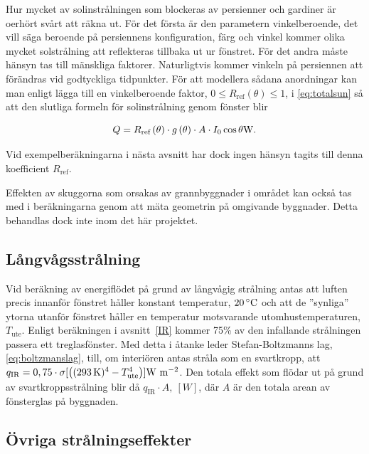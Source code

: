 Hur mycket av solinstrålningen som blockeras av persienner och gardiner är oerhört svårt att räkna ut. För det första är den parametern vinkelberoende, det vill säga beroende på persiennens konfiguration, färg och vinkel kommer olika mycket solstrålning att reflekteras tillbaka ut ur fönstret. För det andra måste hänsyn tas till mänskliga faktorer. Naturligtvis kommer vinkeln på persiennen att förändras vid godtyckliga tidpunkter. För att modellera sådana anordningar kan man enligt \cite{ASHRAE09} lägga till en vinkelberoende faktor, $0 \le R_\text{ref}\left( \theta \right) \le 1$, i \eqref{eq:totalsun} så att den slutliga formeln för solinstrålning genom fönster blir


\begin{equation}\label{eq:totalsunblinds}
Q = R_\text{ref}\left( \theta \right) \cdot g\left( \theta \right) \cdot A \cdot I_0 \cos{\theta} \unit[]{W}.
\end{equation}

Vid exempelberäkningarna i nästa avsnitt har dock ingen hänsyn tagits till denna koefficient  $R_\text{ref}$.

Effekten av skuggorna som orsakas av grannbyggnader i området kan också tas med i beräkningarna genom att mäta geometrin på omgivande byggnader. Detta behandlas dock inte inom det här projektet.

\subsection{Långvågsstrålning}\label{subsec:IRmethod}

Vid beräkning av energiflödet på grund av långvågig strålning antas att luften precis innanför fönstret håller konstant temperatur, $\unit[20]{^{\circ}C}$ och att de ''synliga'' ytorna utanför fönstret håller en temperatur motsvarande utomhustemperaturen, $T_\text{ute}$. Enligt beräkningen i avsnitt~\ref{IR} kommer 75\% av den infallande strålningen passera ett treglasfönster. Med detta i åtanke leder Stefan-Boltzmanns lag, \eqref{eq:boltzmanslag}, till, om interiören antas stråla som en svartkropp, att $q_\text{IR} = 0,75 \cdot \sigma [\left( (\unit[293]{K})^4 - T_\text{ute}^4\right)]\unit{W~m^{-2}}$. Den totala effekt som flödar ut på grund av svartkroppsstrålning blir då $q_\text{IR}\cdot A,~[W]$, där $A$ är den totala arean av fönsterglas på byggnaden.

\subsection{Övriga strålningseffekter}\label{subsec:otherradiation}

